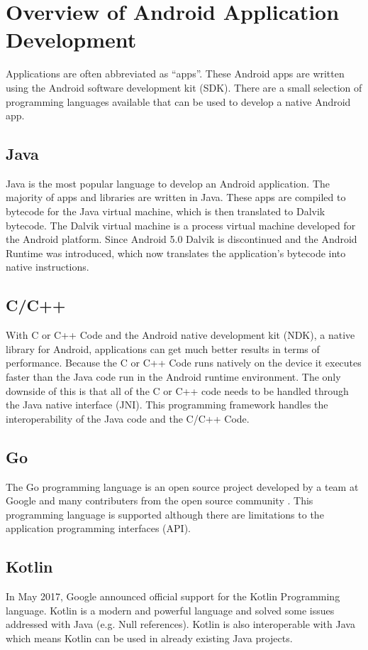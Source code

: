 \section{Overview of Android Application Development}
 Applications are often abbreviated as ``apps''. These Android apps are written using the Android software development kit (SDK). There are a small selection of programming languages available that can be used to develop a native Android app.

\subsection{Java}
Java is the most popular language to develop an Android application. The majority of apps and libraries are written in Java. These apps are compiled to bytecode for the Java virtual machine, which is then translated to Dalvik bytecode. The Dalvik virtual machine is a process virtual machine developed for the Android platform. Since Android 5.0 Dalvik is discontinued and the Android Runtime was introduced, which now translates the application's bytecode into native instructions.

\subsection{C/C++}
With C or C++ Code and the Android native development kit (NDK), a native library for Android, applications can get much better results in terms of performance. Because the C or C++ Code runs natively on the device it executes faster than the Java code run in the Android runtime environment. The only downside of this is that all of the C or C++ code needs to be handled through the Java native interface (JNI). This programming framework handles the interoperability of the Java code and the C/C++ Code.
\subsection{Go}
The Go programming language is an open source project developed by a team at Google and many contributers from the open source community \cite{GoProject}. This programming language is supported although there are limitations to the application programming interfaces (API).

\subsection{Kotlin}
In May 2017, Google announced official support for the Kotlin Programming language. Kotlin is a modern and powerful language and solved some issues addressed with Java (e.g. Null references). Kotlin is also interoperable with Java which means Kotlin can be used in already existing Java projects.

